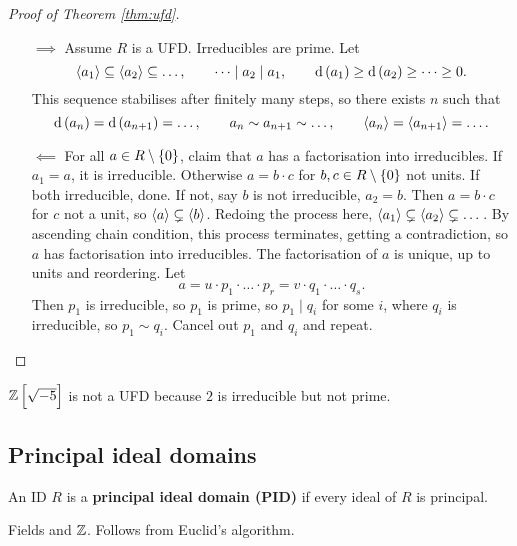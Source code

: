 \begin{proof}[Proof of Theorem \ref{thm:ufd}]
\hfill
\begin{itemize}
\item[$ \implies $] Assume $ R $ is a UFD. Irreducibles are prime. Let
$$ \abr{a_1} \subseteq \abr{a_2} \subseteq \dots, \qquad \dots \mid a_2 \mid a_1, \qquad \d\br{a_1} \ge \d\br{a_2} \ge \dots \ge 0. $$
This sequence stabilises after finitely many steps, so there exists $ n $ such that
$$ \d\br{a_n} = \d\br{a_{n + 1}} = \dots, \qquad a_n \sim a_{n + 1} \sim \dots, \qquad \abr{a_n} = \abr{a_{n + 1}} = \dots. $$
\item[$ \impliedby $] For all $ a \in R \setminus \cbr{0} $, claim that $ a $ has a factorisation into irreducibles. If $ a_1 = a $, it is irreducible. Otherwise $ a = b \cdot c $ for $ b, c \in R \setminus \cbr{0} $ not units. If both irreducible, done. If not, say $ b $ is not irreducible, $ a_2 = b $. Then $ a = b \cdot c $ for $ c $ not a unit, so $ \left\langle a \right\rangle \subsetneq \left\langle b \right\rangle $. Redoing the process here, $ \left\langle a_1 \right\rangle \subsetneq \left\langle a_2 \right\rangle \subsetneq \dots $. By ascending chain condition, this process terminates, getting a contradiction, so $ a $ has factorisation into irreducibles. The factorisation of $ a $ is unique, up to units and reordering. Let
$$ a = u \cdot p_1 \cdot \dots \cdot p_r = v \cdot q_1 \cdot \dots \cdot q_s. $$
Then $ p_1 $ is irreducible, so $ p_1 $ is prime, so $ p_1 \mid q_i $ for some $ i $, where $ q_i $ is irreducible, so $ p_1 \sim q_i $. Cancel out $ p_1 $ and $ q_i $ and repeat.
\end{itemize}
\end{proof}

\begin{remark*}
$ \ZZ\sbr{\sqrt{-5}} $ is not a UFD because $ 2 $ is irreducible but not prime.
\end{remark*}

\subsection{Principal ideal domains}

\begin{definition}
An ID $ R $ is a \textbf{principal ideal domain (PID)} if every ideal of $ R $ is principal.
\end{definition}

\begin{example*}
Fields and $ \mathbb{Z} $. Follows from Euclid's algorithm.
\end{example*}

